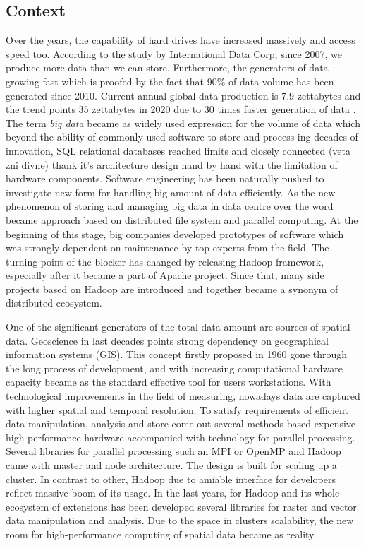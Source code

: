 \documentclass[a4paper,12pt,oneside]{report}
\begin{document}
	\subsection*{Context}
	Over the years, the capability of hard drives have increased massively and
	access speed too. According to the study by International Data Corp, since 2007,
	we produce more data than we can store. Furthermore, the generators of data 
	growing fast which is proofed by the fact that 90\% of data volume has been
	generated since 2010. Current  annual global data production is  7.9 zettabytes
	and the trend points 35 zettabytes in 2020 due to 30 times faster generation of
	data \cite{digit_universe}.  
	The term \textit{big data} became as widely used expression for the volume of
	data which beyond the ability of commonly used software to store and process 
ing decades of innovation, SQL relational databases reached limits
 and closely connected (veta zni divne)
	thank it's architecture design hand by hand with the limitation of
	hardware components.  Software engineering has been naturally pushed to 
	investigate new form for handling big amount of data efficiently.  As  the new
	phenomenon   of storing and managing big data in data centre over the word
	became approach based on distributed file system and parallel computing. At the
	beginning of this stage, big companies developed prototypes of software which
	was strongly dependent on maintenance by top experts from the field.  The
	turning point of the blocker has changed by releasing  Hadoop framework,
	especially after it became a part of Apache project. Since that, many side
	projects based on Hadoop are introduced and together became a synonym of 
	distributed ecosystem.
	
	
	One of the significant generators of the total data amount are sources of
	spatial data.   Geoscience in last decades points strong dependency on
	geographical information systems (GIS). This concept firstly proposed in 1960
	gone through  the long process of development, and with increasing computational
	hardware capacity became as the standard  effective tool for users workstations.
	With technological improvements in the field of measuring, nowadays data are
	captured with higher spatial and temporal resolution. To satisfy requirements of
	efficient data manipulation, analysis and store come out several methods based
	expensive high-performance hardware accompanied with technology for parallel
	processing. Several libraries for parallel processing such an MPI or OpenMP and
	Hadoop came with master and node  architecture. The design is built for scaling up a cluster. In contrast to other, Hadoop due to amiable interface for
	developers reflect massive boom of its usage. In the last years, for Hadoop and its
	whole ecosystem of extensions has been developed several libraries for raster
	and vector data manipulation and analysis. Due to the space in clusters
	scalability, the new room for high-performance computing of spatial data became
	as reality.
	
\end{document}
